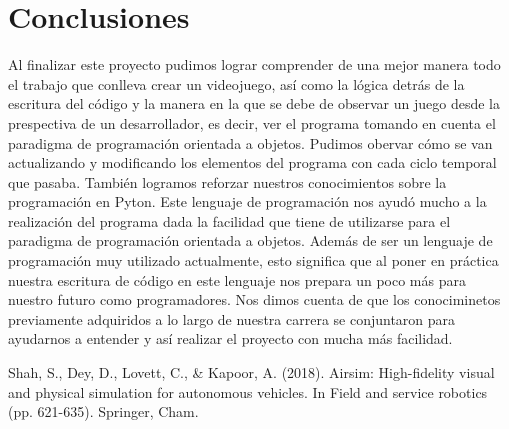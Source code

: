 \documentclass[12pt,letterpaper]{report}
\begin{document}
\chapter{Conclusiones}
Al finalizar este proyecto pudimos lograr comprender de una mejor manera todo el trabajo que conlleva crear un videojuego, así como la lógica detrás de la escritura del código y la manera en la que se debe de observar un juego desde la prespectiva de un desarrollador, es decir, ver el programa tomando en cuenta el paradigma de programación orientada a objetos. \newline
Pudimos obervar cómo se van actualizando y modificando los elementos del programa con cada ciclo temporal que pasaba. \newline \newline
También logramos reforzar nuestros conocimientos sobre la programación en Pyton. Este lenguaje de programación nos ayudó mucho a la realización del programa dada la facilidad que tiene de utilizarse para el paradigma de programación orientada a objetos. Además de ser un lenguaje de programación muy utilizado actualmente, esto significa que al poner en práctica nuestra escritura de código en este lenguaje nos prepara un poco más para nuestro futuro como programadores. \newline
Nos dimos cuenta de que los conociminetos previamente adquiridos a lo largo de nuestra carrera se conjuntaron para ayudarnos a entender y así realizar el proyecto con mucha más facilidad.

\begin{thebibliography}{0}

   Shah, S., Dey, D., Lovett, C., \& Kapoor, A. (2018). Airsim: High-fidelity visual and physical simulation for autonomous vehicles. In Field and service robotics (pp. 621-635). Springer, Cham.
  
\end{thebibliography}
\end{document}

